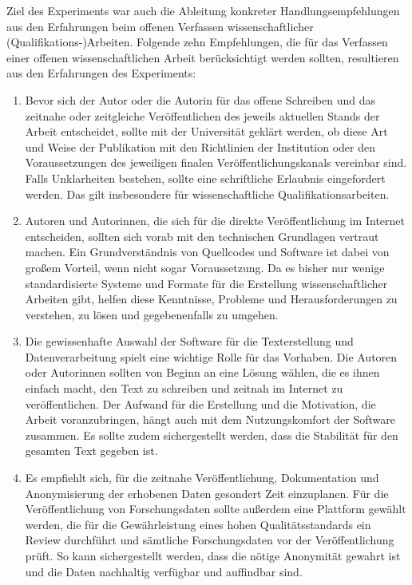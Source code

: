Ziel des Experiments war auch die Ableitung konkreter Handlungsempfehlungen aus den Erfahrungen beim offenen Verfassen wissenschaftlicher (Qualifikations-)Arbeiten. Folgende zehn Empfehlungen, die für das Verfassen einer offenen wissenschaftlichen Arbeit berücksichtigt werden sollten, resultieren aus den Erfahrungen des Experiments:

\begin{enumerate}
\item Bevor sich der Autor oder die Autorin für das offene Schreiben und das zeitnahe oder zeitgleiche Veröffentlichen des jeweils aktuellen Stands der Arbeit entscheidet, sollte mit der Universität geklärt werden, ob diese Art und Weise der Publikation mit den Richtlinien der Institution oder den Voraussetzungen des jeweiligen finalen Veröffentlichungskanals vereinbar sind. Falls Unklarheiten bestehen, sollte eine schriftliche Erlaubnis eingefordert werden. Das gilt insbesondere für wissenschaftliche Qualifikationsarbeiten.
\item Autoren und Autorinnen, die sich für die direkte Veröffentlichung im Internet entscheiden, sollten sich vorab mit den technischen Grundlagen vertraut machen. Ein Grundverständnis von Quellcodes und Software ist dabei von großem Vorteil, wenn nicht sogar Voraussetzung. Da es bisher nur wenige standardisierte Systeme und Formate für die Erstellung wissenschaftlicher Arbeiten gibt, helfen diese Kenntnisse, Probleme und Herausforderungen zu verstehen, zu lösen und gegebenenfalls zu umgehen.
\item Die gewissenhafte Auswahl der Software für die Texterstellung und Datenverarbeitung spielt eine wichtige Rolle für das Vorhaben. Die Autoren oder Autorinnen sollten von Beginn an eine Lösung wählen, die es ihnen einfach macht, den Text zu schreiben und zeitnah im Internet zu veröffentlichen. Der Aufwand für die Erstellung und die Motivation, die Arbeit voranzubringen, hängt auch mit dem Nutzungskomfort der Software zusammen. Es sollte zudem sichergestellt werden, dass die Stabilität für den gesamten Text gegeben ist.
\item Es empfiehlt sich, für die zeitnahe Veröffentlichung, Dokumentation und Anonymisierung der erhobenen Daten gesondert Zeit einzuplanen. Für die Veröffentlichung von Forschungsdaten sollte außerdem eine Plattform gewählt werden, die für die Gewährleistung eines hohen Qualitätsstandards ein Review durchführt und sämtliche Forschungsdaten vor der Veröffentlichung prüft. So kann sichergestellt werden, dass die nötige Anonymität gewahrt ist und die Daten nachhaltig verfügbar und auffindbar sind.

\end{enumerate}
